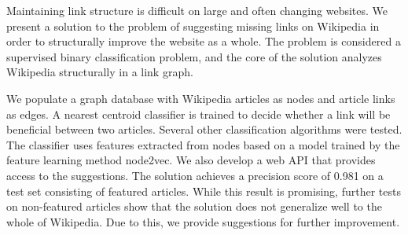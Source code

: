 Maintaining link structure is difficult on large and often changing websites. We present a solution to the problem of suggesting missing links on Wikipedia in order to structurally improve the website as a whole. The problem is considered a supervised binary classification problem, and the core of the solution analyzes Wikipedia structurally in a link graph.

We populate a graph database with Wiki\-pedia articles as nodes and article links as edges. A nearest centroid classifier is trained to decide whether a link will be beneficial between two articles. Several other classification algorithms were tested. The classifier uses features extracted from nodes based on a model trained by the feature learning method node2vec. We also develop a web API that provides access to the suggestions. The solution achieves a precision score of \num{0.981} on a test set consisting of featured articles. While this result is promising, further tests on non-featured articles show that the solution does not generalize well to the whole of Wikipedia. Due to this, we provide suggestions for further improvement.








